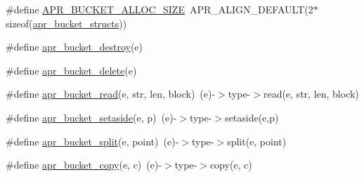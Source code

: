 \begin{DoxyCompactItemize}
\item 
\#define \hyperlink{group___a_p_r___util___bucket___brigades_gae3ccf4c383c9e7fea28354cc8e029626}{A\-P\-R\-\_\-\-B\-U\-C\-K\-E\-T\-\_\-\-A\-L\-L\-O\-C\-\_\-\-S\-I\-Z\-E}~A\-P\-R\-\_\-\-A\-L\-I\-G\-N\-\_\-\-D\-E\-F\-A\-U\-L\-T(2$\ast$sizeof(\hyperlink{unionapr__bucket__structs}{apr\-\_\-bucket\-\_\-structs}))
\item 
\#define \hyperlink{group___a_p_r___util___bucket___brigades_gafc0dae1e90a798284ed777a0c9e90ec6}{apr\-\_\-bucket\-\_\-destroy}(e)
\item 
\#define \hyperlink{group___a_p_r___util___bucket___brigades_ga8925c02a7f95e8c1c3986294d4678797}{apr\-\_\-bucket\-\_\-delete}(e)
\item 
\#define \hyperlink{group___a_p_r___util___bucket___brigades_gae44ae938c6c60e148430fdb098dcf28f}{apr\-\_\-bucket\-\_\-read}(e, str, len, block)~(e)-\/$>$type-\/$>$read(e, str, len, block)
\item 
\#define \hyperlink{group___a_p_r___util___bucket___brigades_gab00941ffd472982693eb415a964de7af}{apr\-\_\-bucket\-\_\-setaside}(e, p)~(e)-\/$>$type-\/$>$setaside(e,p)
\item 
\#define \hyperlink{group___a_p_r___util___bucket___brigades_ga5bb8827a8dd1baa6ac32682e13e9d8c2}{apr\-\_\-bucket\-\_\-split}(e, point)~(e)-\/$>$type-\/$>$split(e, point)
\item 
\#define \hyperlink{group___a_p_r___util___bucket___brigades_gab33cc08b7f064d06397f312e427279c3}{apr\-\_\-bucket\-\_\-copy}(e, c)~(e)-\/$>$type-\/$>$copy(e, c)
\end{DoxyCompactItemize}

